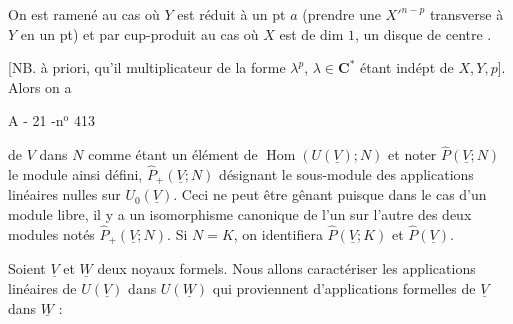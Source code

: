 On est ramené au cas où $Y$ est réduit à un pt $a$ (prendre une  $X'^{n-p}$ transverse à $Y$ en un pt) et par cup-produit au cas où $X$ est de dim $1$,  un disque de centre .

[NB. à priori,  qu'il  multiplicateur de la forme $\lambda^p$, $\lambda\in\mathbf C^*$ étant indépt de $X,Y,p$]. Alors on a

\begin{center}A - 21 -\hfill n$^{\mathrm o}$ 413\end{center}

de $V$ dans $N$ comme étant un élément de $\operatorname{Hom}(U(\underline V);N)$ et noter $\widehat P(\underline V;N)$ le module ainsi défini, $\widehat P_+(\underline V;N)$ désignant le sous-module des applications linéaires nulles sur $U_0(\underline V)$. Ceci ne peut être gênant puisque dans le cas d'un module libre, il y a un isomorphisme canonique de l'un sur l'autre des deux modules notés $\widehat P_+(\underline V;N)$. Si $N=K$, on identifiera $\widehat P(\underline V;K)$ et $\widehat P(\underline V)$.

Soient $\underline V$ et $\underline W$ deux noyaux formels. Nous allons caractériser les applications linéaires de $U(\underline V)$ dans $U(\underline W)$ qui proviennent d'applications formelles de $\underline V$ dans $\underline W$ :

